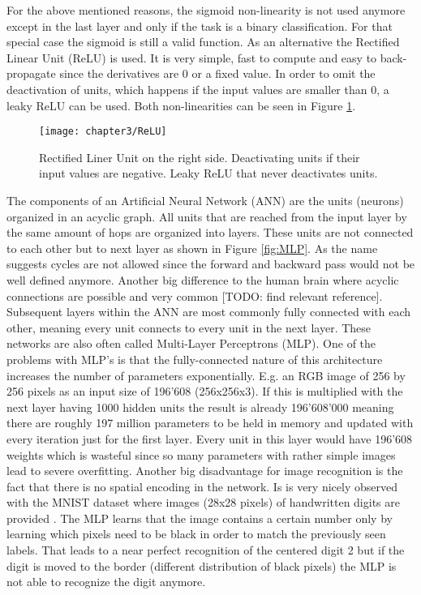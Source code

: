 For the above mentioned reasons, the sigmoid non-linearity is not used anymore except in the last layer and only if the task is a binary classification. For that special case the sigmoid is still a valid function. As an alternative the Rectified Linear Unit (ReLU) is used. It is very simple, fast to compute and easy to back-propagate since the derivatives are 0 or a fixed value. In order to omit the deactivation of units, which happens if the input values are smaller than 0, a leaky ReLU can be used. Both non-linearities can be seen in Figure \ref{fig:ReLU}.

\begin{figure}[H]
  \centering
  \caption{Rectified Liner Unit on the right side. Deactivating units if their input values are negative. Leaky ReLU that never deactivates units. \cite{reinventingNN}}
  \texttt{[image: chapter3/ReLU]}
  \label{fig:ReLU}
\end{figure}

The components of an Artificial Neural Network (ANN) are the units (neurons) organized in an acyclic graph. All units that are reached from the input layer by the same amount of hops are organized into layers. These units are not connected to each other but to next layer as shown in Figure \ref{fig:MLP}. As the name suggests cycles are not allowed since the forward and backward pass would not be well defined anymore. Another big difference to the human brain where acyclic connections are possible and very common [TODO: find relevant reference]. Subsequent layers within the ANN are most commonly fully connected with each other, meaning every unit connects to every unit in the next layer. These networks are also often called Multi-Layer Perceptrons (MLP). One of the problems with MLP's is that the fully-connected nature of this architecture increases the number of parameters exponentially. E.g. an RGB image of 256 by 256 pixels as an input size of 196'608 (256x256x3). If this is multiplied with the next layer having 1000 hidden units the result is already 196'608'000 meaning there are roughly 197 million parameters to be held in memory and updated with every iteration just for the first layer. Every unit in this layer would have 196'608 weights which is wasteful since so many parameters with rather simple images lead to severe overfitting. Another big disadvantage for image recognition is the fact that there is no spatial encoding in the network. Is is very nicely observed with the MNIST dataset where images (28x28 pixels) of handwritten digits are provided \cite{MNISTdatabase}. The MLP learns that the image contains a certain number only by learning which pixels need to be black in order to match the previously seen labels. That leads to a near perfect recognition of the centered digit 2 but if the digit is moved to the border (different distribution of black pixels) the MLP is not able to recognize the digit anymore.

